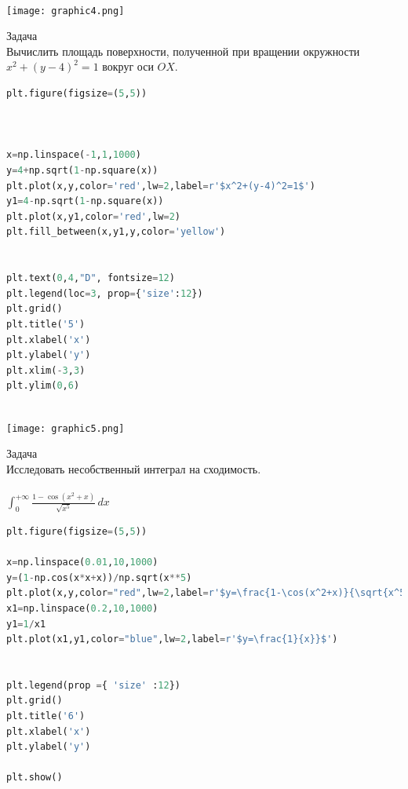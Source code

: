 \documentclass{article}
\begin{document}
\\
\texttt{[image: graphic4.png]}





\newpage
\begin{section}{Задача}\\

Вычислить площадь поверхности, полученной при вращении
окружности $x^2+(y-4)^2=1$ вокруг оси $OX$.
\\
\begin{lstlisting}[language=Python]
plt.figure(figsize=(5,5))



x=np.linspace(-1,1,1000)
y=4+np.sqrt(1-np.square(x))
plt.plot(x,y,color='red',lw=2,label=r'$x^2+(y-4)^2=1$')
y1=4-np.sqrt(1-np.square(x))
plt.plot(x,y1,color='red',lw=2)
plt.fill_between(x,y1,y,color='yellow')


plt.text(0,4,"D", fontsize=12)
plt.legend(loc=3, prop={'size':12})
plt.grid()
plt.title('5')
plt.xlabel('x')
plt.ylabel('y')
plt.xlim(-3,3)
plt.ylim(0,6)

\end{lstlisting}


\end{section}

\\
\texttt{[image: graphic5.png]}




\newpage
\begin{section}{Задача}\\

Исследовать несобственный интеграл на сходимость.\\ \\
$\int_{0}^{+\infty}\frac{1-\cos(x^2+x)}{\sqrt{x^5}}\,dx$
\\
\begin{lstlisting}[language=Python]
plt.figure(figsize=(5,5))

x=np.linspace(0.01,10,1000)
y=(1-np.cos(x*x+x))/np.sqrt(x**5)
plt.plot(x,y,color="red",lw=2,label=r'$y=\frac{1-\cos(x^2+x)}{\sqrt{x^5}}$')
x1=np.linspace(0.2,10,1000)
y1=1/x1
plt.plot(x1,y1,color="blue",lw=2,label=r'$y=\frac{1}{x}}$')


plt.legend(prop ={ 'size' :12})
plt.grid()
plt.title('6')
plt.xlabel('x')
plt.ylabel('y')

plt.show()
\end{lstlisting}


\end{section}
\end{document}
